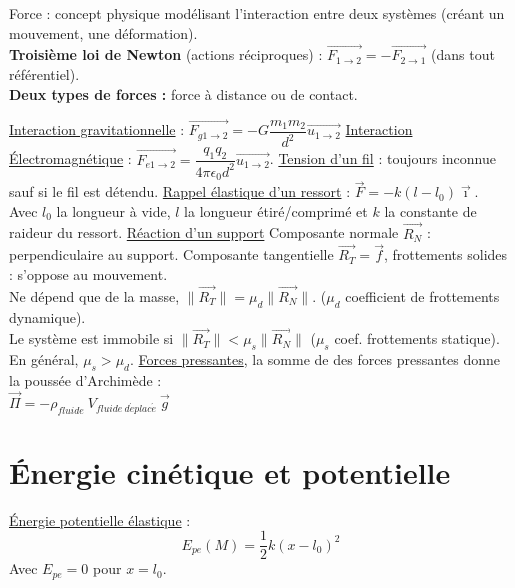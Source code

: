\documentclass[13pt, twoside, a4paper, french]{report}
\begin{document}
      Force : concept physique modélisant l'interaction entre deux systèmes (créant un mouvement, une déformation).\\
      
      \textbf{Troisième loi de Newton} (actions réciproques) : $\overrightarrow{F_{1\rightarrow2}} = - \overrightarrow{F_{2\rightarrow1}}$ (dans tout référentiel).\\
      
      \textbf{Deux types de forces :} force à distance ou de contact.
      \begin{outline}
        \1 \underline{Interaction gravitationnelle} : $\overrightarrow{F_{g1\rightarrow2}} = - G\dfrac{m_1 m_2}{d^2}\overrightarrow{u_{1\rightarrow2}}$
        \1 \underline{Interaction Électromagnétique} : $\overrightarrow{F_{e1\rightarrow2}} = \dfrac{q_1 q_2}{4\pi\epsilon_0 d^2}\overrightarrow{u_{1\rightarrow2}}$.
        \1 \underline{Tension d'un fil} : toujours inconnue sauf si le fil est détendu.
        \1 \underline{Rappel élastique d'un ressort} : $\vec{F} = - k (l - l_0)\vec{\imath}$.\\Avec $l_0$ la longueur à vide, $l$ la longueur étiré/comprimé et $k$ la constante de raideur du ressort.
        \1 \underline{Réaction d'un support}
        \2 Composante normale $\overrightarrow{R_N}$ : perpendiculaire au support.
        \2 Composante tangentielle $\overrightarrow{R_T} = \overrightarrow{f}$, frottements solides : s'oppose au mouvement.\\Ne dépend que de la masse, $\|\overrightarrow{R_T}\| = \mu_d \|\overrightarrow{R_N}\|$. ($\mu_d$ coefficient de frottements dynamique).\\Le système est immobile si $\|\overrightarrow{R_T}\| < \mu_s \|\overrightarrow{R_N}\|$ ($\mu_s$ coef. frottements statique). En général, $\mu_s > \mu_d$.
        \1 \underline{Forces pressantes}, la somme de des forces pressantes donne la poussée d'Archimède :
        \\$\overrightarrow{\Pi} = - \rho_{fluide}\ V_{fluide \ d\acute eplac\acute e}\ \vec{g}$
      \end{outline}
  
  
  \section{Énergie cinétique et potentielle}\label{sec:energie-cinetique-et-potentielle}
    
    \underline{Énergie potentielle élastique} : \[\displaystyle E_{pe}(M) = \dfrac{1}{2} k (x - l_0)^2\]
    Avec $E_{pe} = 0$ pour $x = l_0$.
  
\end{document}

